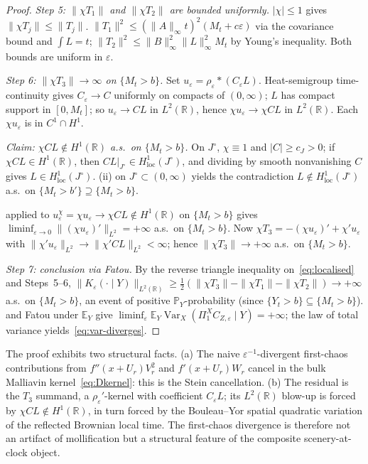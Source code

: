 \documentclass[EJP]{ejpecp}
\newcommand{\R}{\mathbb{R}}
\renewcommand{\E}{\mathbb{E}}
\newcommand{\Prob}{\mathbb{P}}
\newcommand{\IBM}{Z}
\newcommand{\Pir}{\Pi}
\DeclareMathOperator{\Var}{Var}
\begin{document}
\begin{proof}
\emph{Step 5: $\|\chi T_1\|$ and $\|\chi T_2\|$ are bounded
uniformly.}
$|\chi|\le 1$ gives $\|\chi T_j\|\le\|T_j\|$.
$\|T_1\|^{2}\le(\|A\|_\infty t)^{2}(M_t+c\varepsilon)$ via the
covariance bound and $\int L=t$;
$\|T_2\|^{2}\le\|B\|_\infty^{2}\|L\|_\infty^{2}M_t$ by Young's
inequality. Both bounds are uniform in $\varepsilon$.

\emph{Step 6: $\|\chi T_3\|\to\infty$ on $\{M_t>b\}$.}
Set $u_\varepsilon=\rho_\varepsilon*(C_\varepsilon L)$. Heat-semigroup
time-continuity gives $C_\varepsilon\to C$ uniformly on compacts of
$(0,\infty)$; $L$ has compact support in $[0,M_t]$; so
$u_\varepsilon\to CL$ in $L^{2}(\R)$, hence $\chi u_\varepsilon\to\chi CL$
in $L^{2}(\R)$. Each $\chi u_\varepsilon$ is in $C^{1}\cap H^{1}$.

\emph{Claim: $\chi CL\notin H^{1}(\R)$ a.s.\ on $\{M_t>b\}$.}
On $J^{\circ}$, $\chi\equiv 1$ and $|C|\ge c_J>0$; if
$\chi CL\in H^{1}(\R)$, then $CL|_{J^{\circ}}\in H^{1}_{\mathrm{loc}}(J^{\circ})$,
and dividing by smooth nonvanishing $C$ gives
$L\in H^{1}_{\mathrm{loc}}(J^{\circ})$. (ii)
on $J^{\circ}\subset(0,\infty)$ yields the contradiction
$L\notin H^{1}_{\mathrm{loc}}(J^{\circ})$ a.s.\ on $\{M_t>b'\}\supseteq\{M_t>b\}$.

 applied to
$u_\varepsilon^{\chi}=\chi u_\varepsilon\to\chi CL\notin H^{1}(\R)$
on $\{M_t>b\}$ gives
$\liminf_{\varepsilon\to 0}\|(\chi u_\varepsilon)'\|_{L^{2}}=+\infty$
a.s.\ on $\{M_t>b\}$. Now $\chi T_3=-(\chi u_\varepsilon)'+\chi'u_\varepsilon$
with $\|\chi'u_\varepsilon\|_{L^{2}}\to\|\chi'CL\|_{L^{2}}<\infty$;
hence $\|\chi T_3\|\to+\infty$ a.s.\ on $\{M_t>b\}$.

\emph{Step 7: conclusion via Fatou.}
By the reverse triangle inequality on~\eqref{eq:localised} and
Steps~5--6,
\(
  \|K_\varepsilon(\cdot\mid Y)\|_{L^{2}(\R)}
   \ge\tfrac12(\|\chi T_3\|-\|\chi T_1\|-\|\chi T_2\|)
   \to+\infty
\)
a.s.\ on $\{M_t>b\}$, an event of positive $\Prob_Y$-probability
(since $\{Y_t>b\}\subseteq\{M_t>b\}$).  and
Fatou under $\E_Y$ give
$\liminf_\varepsilon\E_Y\Var_X(\Pir_1^{X}C_{\IBM,\varepsilon}\mid Y)=+\infty$;
the law of total variance yields~\eqref{eq:var-diverges}.
\end{proof}

\begin{remark}\label{rem:obstr-anatomy}
The proof exhibits two structural facts. (a) The naive
$\varepsilon^{-1}$-divergent first-chaos contributions from
$f''(x+U_r)V_r^{2}$ and $f'(x+U_r)W_r$ cancel in the bulk Malliavin
kernel~\eqref{eq:Dkernel}: this is the Stein cancellation. (b) The residual is the $T_3$ summand, a
$\rho_\varepsilon'$-kernel with coefficient $C_\varepsilon L$; its
$L^{2}(\R)$ blow-up is forced by $\chi CL\notin H^{1}(\R)$, in turn
forced by the Bouleau--Yor spatial quadratic variation of the
reflected Brownian local time. The first-chaos divergence is
therefore not an artifact of mollification but a structural feature
of the composite scenery-at-clock object.
\end{remark}
\end{document}
